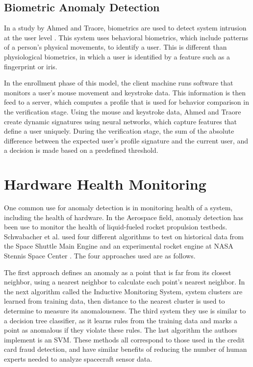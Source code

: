\documentclass[midd]{thesis}
\begin{document}
\subsection{Biometric Anomaly Detection}

In a study by Ahmed and Traore, biometrics are used to detect system intrusion at the user level \cite{Ahmed2005}. This system uses behavioral biometrics, which include patterns of a person's physical movements, to identify a user. This is different than physiological biometrics, in which a user is identified by a feature such as a fingerprint or iris. 

In the enrollment phase of this model, the client machine runs software that monitors a user's mouse movement and keystroke data. This information is then feed to a server, which computes a profile that is used for behavior comparison in the verification stage. Using the mouse and keystroke data, Ahmed and Traore create dynamic signatures using neural networks, which capture features that define a user uniquely. During the verification stage, the sum of the absolute difference between the expected user's profile signature and the current user, and a decision is made based on a predefined threshold.

\section{Hardware Health Monitoring}

One common use for anomaly detection is in monitoring health of a system, including the health of hardware. In the Aerospace field, anomaly detection has been use to monitor the health of liquid-fueled rocket propulsion testbeds. Schwabacher et al. used four different algorithms to test on historical data from the Space Shuttle Main Engine and an experimental rocket engine at NASA Stennis Space Center \cite{Schwabacher2009}. The four approaches used are as follows. 

The first approach defines an anomaly as a point that is far from its closest neighbor, using a nearest neighbor to calculate each point's nearest neighbor. In the next algorithm called the Inductive Monitoring System, system clusters are learned from training data, then distance to the nearest cluster is used to determine to measure its anomalousness. The third system they use is similar to a decision tree classifier, as it learns rules from the training data and marks a point as anomalous if they violate these rules. The last algorithm the authors implement is an SVM. These methods all correspond to those used in the credit card fraud detection, and have similar benefits of reducing the number of human experts needed to analyze spacecraft sensor data. 
\end{document}
